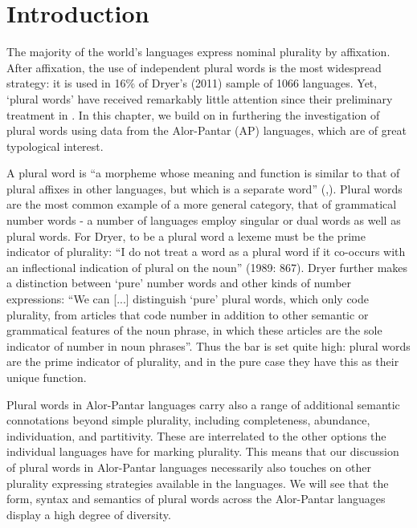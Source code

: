  
\section{Introduction}\label{sec:9:1}%
 
\hypertarget{Toc376962648}{}
The majority of the world's languages express nominal plurality by affixation. After affixation, the use of independent plural words is the most widespread strategy: it is used in 16\% of Dryer's (2011) sample of 1066 languages.\nocite{Dryer2011} Yet, `plural words' have received remarkably little attention since their preliminary treatment in \citet{Dryer1989}. In this chapter, we build on  \citet{SchapperEtAl2011plural} in furthering the investigation of plural words using data from the Alor-Pantar (AP) languages, which are of great typological interest.

A plural word is ``a morpheme whose meaning and function is similar to that of plural affixes in other languages, but which is a separate word'' (\citealt[865]{Dryer1989},\citealt[166]{Dryer2007}). Plural words are the most common example of a more general category, that of grammatical number words - a number of languages employ singular or dual words as well as plural words. For Dryer, to be a plural word a lexeme must be the prime indicator of plurality: ``I do not treat a word as a plural word if it co-occurs with an inflectional indication of plural on the noun'' (1989: 867). Dryer further makes a distinction between `pure' number words and other kinds of number expressions: ``We can [...] distinguish `pure' plural words, which only code plurality, from articles that code number in addition to other semantic or grammatical features of the noun phrase, in which these articles are the sole indicator of number in noun phrases''. Thus the bar is set quite high: plural words are the prime indicator of plurality, and in the
pure case they have this as their unique function.

 Plural words in Alor-Pantar languages carry also a range of additional semantic connotations beyond simple plurality, including completeness, abundance, individuation, and partitivity. These are interrelated to the other options the individual languages have for marking plurality. This means that our discussion of plural words in Alor-Pantar languages necessarily also touches on other plurality expressing strategies available in the languages. We will see that the form, syntax and semantics of plural words across the Alor-Pantar languages display a high degree of diversity.

